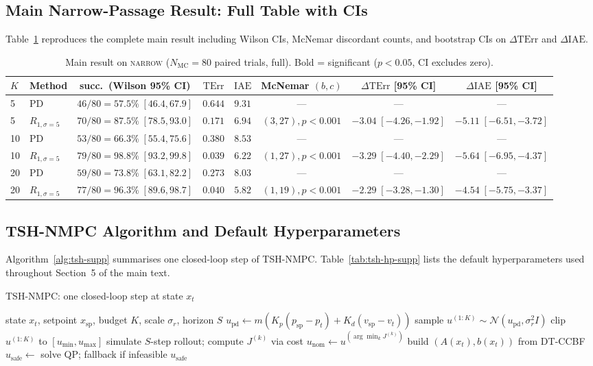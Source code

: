 \documentclass[11pt,a4paper]{article}
\newcommand{\Nm}{N_{\mathrm{MC}}}
\newcommand{\spt}{\mathrm{sp}}
\newcommand{\pd}{\mathrm{pd}}
\newcommand{\nom}{\mathrm{nom}}
\newcommand{\safe}{\mathrm{safe}}
\newcommand{\TErr}{\mathrm{TErr}}
\newcommand{\IAE}{\mathrm{IAE}}
\begin{document}
\subsection{Main Narrow-Passage Result: Full Table with CIs}
Table~\ref{tab:s1-main-full} reproduces the complete main result
including Wilson CIs, McNemar discordant counts, and bootstrap CIs
on $\Delta\TErr$ and $\Delta\IAE$.
\begin{table}[h]
\centering
\caption{Main result on \textsc{narrow} ($\Nm = 80$ paired trials,
full). Bold = significant ($p < 0.05$, CI excludes zero).}\label{tab:s1-main-full}
{\small
\begin{tabular}{llcccccc}
\toprule
$K$ & Method & succ.\ (Wilson 95\% CI) & $\TErr$ & $\IAE$ &
McNemar $(b,c)$ & $\Delta\TErr$ [95\% CI] & $\Delta\IAE$ [95\% CI] \\
\midrule
5  & PD & $46/80=57.5\%\;[46.4,67.9]$ & $0.644$ & $9.31$ & --- & --- & --- \\
5  & $R_{1,\sigma=5}$ & $70/80=87.5\%\;[78.5,93.0]$ & $0.171$ & $6.94$ &
$(3,27),p{<}0.001$ & $-3.04\;[-4.26,-1.92]$ & $-5.11\;[-6.51,-3.72]$ \\
\midrule
10 & PD & $53/80=66.3\%\;[55.4,75.6]$ & $0.380$ & $8.53$ & --- & --- & --- \\
10 & $R_{1,\sigma=5}$ & $79/80=98.8\%\;[93.2,99.8]$ & $0.039$ & $6.22$ &
$(1,27),p{<}0.001$ & $-3.29\;[-4.40,-2.29]$ & $-5.64\;[-6.95,-4.37]$ \\
\midrule
20 & PD & $59/80=73.8\%\;[63.1,82.2]$ & $0.273$ & $8.03$ & --- & --- & --- \\
20 & $R_{1,\sigma=5}$ & $77/80=96.3\%\;[89.6,98.7]$ & $0.040$ & $5.82$ &
$(1,19),p{<}0.001$ & $-2.29\;[-3.28,-1.30]$ & $-4.54\;[-5.75,-3.37]$ \\
\bottomrule
\end{tabular}}
\end{table}

\subsection{TSH-NMPC Algorithm and Default Hyperparameters}
Algorithm~\ref{alg:tsh-supp} summarises one closed-loop step of
TSH-NMPC. Table~\ref{tab:tsh-hp-supp} lists the default
hyperparameters used throughout Section~5 of the main text.
\begin{algorithm}[h]
\caption{TSH-NMPC: one closed-loop step at state $x_t$}\label{alg:tsh-supp}
\begin{algorithmic}[1]
\Require state $x_t$, setpoint $x_\spt$, budget $K$, scale $\sigma_r$, horizon $S$
\State $u_\pd \gets m (K_p(p_\spt - p_t) + K_d(v_\spt - v_t))$ 
\State sample $u^{(1{:}K)} \sim \mathcal{N}(u_\pd, \sigma_r^2 I)$ 
\State clip $u^{(1{:}K)}$ to $[u_{\min}, u_{\max}]$
  \State simulate $S$-step rollout; compute $J^{(k)}$ via cost
\EndFor
\State $u_\nom \gets u^{(\arg\min_k J^{(k)})}$ 
\State build $(A(x_t), b(x_t))$ from DT-CCBF
\State $u_\safe \gets$ solve QP; fallback if infeasible
\State \Return $u_\safe$
\end{algorithmic}
\end{algorithm}
\end{document}
